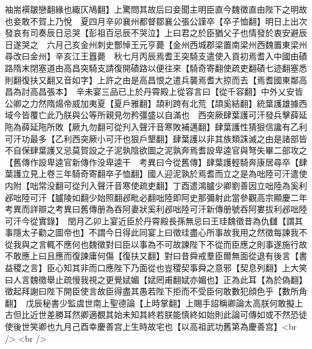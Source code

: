袖耑襈皺戀翻緣也緅仄鳩翻】上驚問其故后曰妾聞主明臣直今魏徵直由陛下之明故也妾敢不賀上乃悅　夏四月辛卯襄州都督鄒襄公張公謹卒【卒子恤翻】明日上出次發哀有司奏辰日忌哭【彭祖百忌辰不哭泣】上曰君之於臣猶父子也情發於衷安避辰日遂哭之　六月己亥金州刺史酆悼王元亨薨【金州西城郡梁置南梁州西魏置東梁州尋改曰金州】辛亥江王囂薨　秋七月丙辰焉耆王突騎支遣使入貢初焉耆入中國由磧路隋末閉塞道由高昌突騎支請復開磧路以便往來【騎奇寄翻使疏吏翻磧七迹翻塞悉則翻復扶又翻又音如字】上許之由是高昌恨之遣兵襲焉耆大掠而去【焉耆國東鄰高昌為討高昌張本】　辛未宴三品已上於丹霄殿上從容言曰【從千容翻】中外乂安皆公卿之力然隋煬帝威加夷夏【夏戶雅翻】頡利跨有北荒【頡奚結翻】統葉護雄據西域今皆覆亡此乃朕與公等所親見勿矜彊盛以自滿也　西突厥肆葉護可汗發兵擊薛延陁為薛延陁所敗【厥九勿翻可從刋入聲汗音寒敗補邁翻】肆葉護性猜狠信讒有乙利可汗功最多【乙利西突厥小可汗也狠戶墾翻】肆葉護以非其族類誅滅之由是諸部皆不自保肆葉護又忌莫賀設之子泥孰陰欲圖之泥孰奔焉耆設卑逵官與弩失畢二部攻之【舊傳作設卑逵官新傳作没卑逵干　考異曰今從舊傳】肆葉護輕騎奔康居尋卒【肆葉護立見上卷三年騎奇寄翻卒子恤翻】國人迎泥孰於焉耆而立之是為咄陸可汗遣使内附【咄常没翻可從刋入聲汗音寒使疏吏翻】丁酉遣鴻臚少卿劉善因立咄陸為奚利邲咄陸可汗【臚陵如翻少始照翻邲毗必翻咄陸即阿史那彌射此當參觀高宗顯慶二年考異而詳辯之考異曰舊傳册為吞阿妻狀奚利邲咄陸可汗新傳册號吞阿婁拔利邲咄陸可汗今從實錄】　閏月乙卯上宴近臣於丹霄殿長孫無忌曰王珪魏徵昔為仇讎【謂其事隱太子勸之圖帝也】不謂今日得此同宴上曰徵珪盡心所事故我用之然徵每諫我不從我與之言輒不應何也魏徵對曰臣以事為不可故諫陛下不從而臣應之則事遂施行故不敢應上曰且應而復諫庸何傷【復扶又翻】對曰昔舜戒羣臣爾無面從退有後言【書益稷之言】臣心知其非而口應陛下乃面從也豈稷契事舜之意邪【契息列翻】上大笑曰人言魏徵舉止疏慢我視之更覺娬媚【娬罔甫翻娬亦媚也】正為此耳【為於偽翻】徵起拜謝曰陛下開臣使言故臣得盡其愚若陛下拒而不受臣何敢數犯顔色乎【數所角翻】　戊辰秘書少監虞世南上聖德論【上時掌翻】上賜手詔稱卿論太高朕何敢擬上古但比近世差勝耳然卿適覩其始未知其終若朕能慎終如始則此論可傳如或不然恐徒使後世笑卿也九月己酉幸慶善宫上生時故宅也【以高祖武功舊第為慶善宫】<br />
<br />
